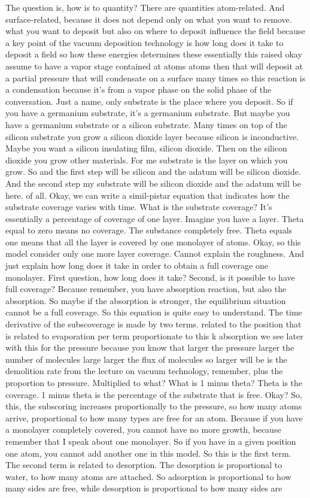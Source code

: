 The question is, how is to quantity? There are quantities atom-related. And surface-related, because it does not depend only on what you want to remove. what you want to deposit but also on where to deposit influence the field because a key point of the vacuum deposition technology is how long does it take to deposit a field so how these energies determines these essentially this raised okay assume to have a vapor stage contained at atoms atoms then that will deposit at a partial pressure that will condensate on a surface many times so this reaction is a condensation because it's from a vapor phase on the solid phase of the conversation. Just a name, only substrate is the place where you deposit. So if you have a germanium substrate, it's a germanium substrate. But maybe you have a germanium substrate or a silicon substrate. Many times on top of the silicon substrate you grow a silicon dioxide layer because silicon is inconductive. Maybe you want a silicon insulating film, silicon dioxide. Then on the silicon dioxide you grow other materials. For me substrate is the layer on which you grow. So and the first step will be silicon and the adatum will be silicon dioxide. And the second step my substrate will be silicon dioxide and the adatum will be here. of all. Okay, we can write a simil-pistar equation that indicates how the substrate coverage varies with time. What is the substrate coverage? It's essentially a percentage of coverage of one layer. Imagine you have a layer. Theta equal to zero means no coverage. The substance completely free. Theta equals one means that all the layer is covered by one monolayer of atoms. Okay, so this model consider only one more layer coverage. Cannot explain the roughness. And just explain how long does it take in order to obtain a full coverage one monolayer. First question, how long does it take? Second, is it possible to have full coverage? Because remember, you have absorption reaction, but also the absorption. So maybe if the absorption is stronger, the equilibrium situation cannot be a full coverage. So this equation is quite easy to understand. The time derivative of the subscoverage is made by two terms. related to the position that is related to evaporation per term proportionate to this k absorption we see later with this for the pressure because you know that larger the pressure larger the number of molecules large larger the flux of molecules so larger will be is the demolition rate from the lecture on vacuum technology, remember, plus the proportion to pressure. Multiplied to what? What is 1 minus theta? Theta is the coverage. 1 minus theta is the percentage of the substrate that is free. Okay? So, this, the subscoring increases proportionally to the pressure, so how many atoms arrive, proportional to how many types are free for an atom. Because if you have a monolayer completely covered, you cannot have no more growth, because remember that I speak about one monolayer. So if you have in a given position one atom, you cannot add another one in this model. So this is the first term. The second term is related to desorption. The desorption is proportional to water, to how many atoms are attached. So adsorption is proportional to how many sides are free, while desorption is proportional to how many sides are 